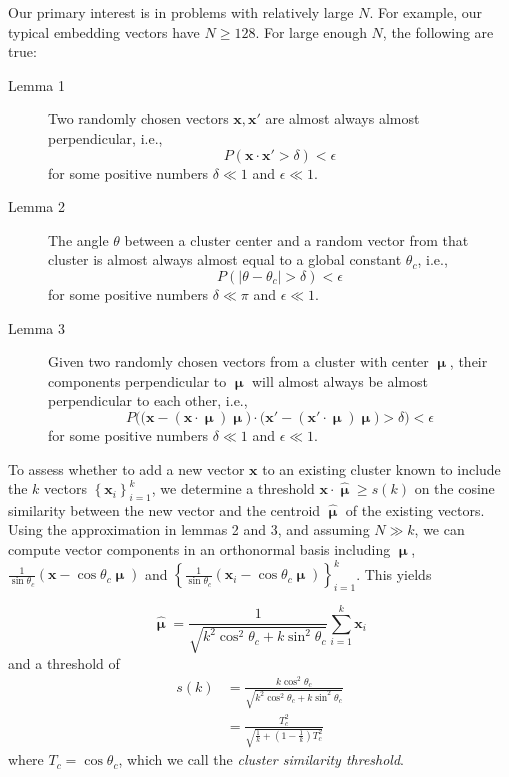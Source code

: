 \documentclass{article}
\begin{document}
Our primary interest is in problems with relatively large $N$. For example, our typical embedding vectors have $N\ge128$. For large enough $N$, the following are true:

\begin{description}
  \item [Lemma 1] Two randomly chosen vectors $\mathbf{x},\mathbf{x'}$ are almost always almost perpendicular, i.e.,
  \begin{equation}
  P(\mathbf{x}\cdot\mathbf{x'}>\delta)<\epsilon
  \end{equation}
  for some positive numbers $\delta\ll1$ and $\epsilon\ll1$.
  \item [Lemma 2] The angle $\theta$ between a cluster center and a random vector from that cluster is almost always almost equal to a global constant $\theta_c$, i.e.,
  \begin{equation}\label{key}
  P\left(|\theta-\theta_c|>\delta\right)<\epsilon
  \end{equation}
  for some positive numbers $\delta\ll\pi$ and $\epsilon\ll1$.
  \item [Lemma 3] Given two randomly chosen vectors from a cluster with center $\bm{\upmu}$, their components perpendicular to $\bm{\upmu}$ will almost always be almost perpendicular to each other, i.e.,
  \begin{equation}
  P\Big(\big(\mathbf{x}-(\mathbf{x}\cdot\bm{\upmu})\bm{\upmu}\big)\cdot\big(\mathbf{x'}-(\mathbf{x'}\cdot\bm{\upmu})\bm{\upmu}\big)>\delta\Big)<\epsilon
  \end{equation}
  for some positive numbers $\delta\ll1$ and $\epsilon\ll1$.
\end{description}

To assess whether to add a new vector $\mathbf{x}$ to an existing cluster known to include the $k$ vectors $\left\lbrace\mathbf{x}_i\right\rbrace_{i=1}^k$, we determine a threshold $\mathbf{x}\cdot\bm{\hat{\upmu}}\geq s(k)$ on the cosine similarity between the new vector and the centroid $\bm{\hat{\upmu}}$ of the existing vectors. Using the approximation in lemmas 2 and 3, and assuming $N\gg k$, we can compute vector components in an orthonormal basis including $\bm{\upmu}$, $\frac{1}{\sin\theta_c}(\mathbf{x}-\cos\theta_c\bm{\upmu})$ and $\left\lbrace \frac{1}{\sin\theta_c}\left(\mathbf{x}_i-\cos\theta_c\bm{\upmu}\right)\right\rbrace_{i=1}^k$. This yields

\begin{equation}
\bm{\hat{\upmu}}=\frac{1}{\sqrt{k^2\cos^2\theta_c+k\sin^2\theta_c}}\sum_{i=1}^{k}\mathbf{x}_i
\end{equation}
and a threshold of
\begin{equation}\label{eqn:single_threshold}
\begin{split}
s(k) & =\frac{k\cos^2\theta_c}{\sqrt{k^2\cos^2\theta_c+k\sin^2\theta_c}} \\
& =\frac{T_c^2}{\sqrt{\frac{1}{k}+\left(1-\frac{1}{k}\right)T_c^2}}
\end{split}
\end{equation}
where $T_c=\cos\theta_c$, which we call the \textit{cluster similarity threshold}.
\end{document}
